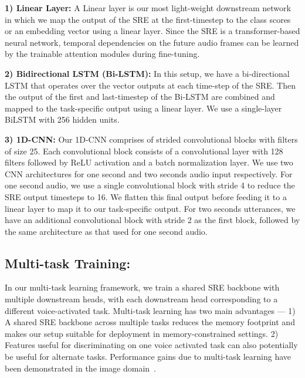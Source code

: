\documentclass{article}
\begin{document}
\noindent \textbf{1) Linear Layer:} A Linear layer is our most light-weight downstream network in which we map the output of the SRE at the first-timestep to the class scores or an embedding vector using a linear layer. Since the SRE is a transformer-based neural network, temporal dependencies on the future audio frames can be learned by the trainable attention modules during fine-tuning. 

\noindent \textbf{2) Bidirectional LSTM (Bi-LSTM):} In this setup, we have a bi-directional LSTM that operates over the vector outputs at each time-step of the SRE. Then the output of the first and last-timestep of the Bi-LSTM are combined and mapped to the task-specific output using a linear layer. We use a single-layer BiLSTM with 256 hidden units.
    
\noindent \textbf{3) 1D-CNN:} 
Our 1D-CNN comprises of strided convolutional blocks with filters of size 25. Each convolutional block consists of a convolutional layer with 128 filters followed by ReLU activation and a batch normalization layer.
We use two CNN architectures for one second and two seconds audio input respectively. For one second audio, we use a single convolutional block with stride 4 to reduce the SRE output timesteps to 16. We flatten this final output before feeding it to a linear layer to map it to our task-specific output. 
For two seconds utterances, we have an additional convolutional block with stride 2 as the first block, followed by the same architecture as that used for one second audio. 
\subsection{Multi-task Training:}




In our multi-task learning framework, we train a shared SRE backbone with multiple downstream heads, with each downstream head corresponding to a different voice-activated task. Multi-task learning has two main advantages --- 1) A shared SRE backbone across multiple tasks reduces the memory footprint and makes our setup suitable for deployment in memory-constrained settings. 
2) Features useful for discriminating on one voice activated task can also potentially be useful for alternate tasks.
Performance gains due to multi-task learning have been demonstrated in the image domain~\cite{xiang2017joint,9427073,deng2020retinaface,lin2017focal}.
\end{document}
